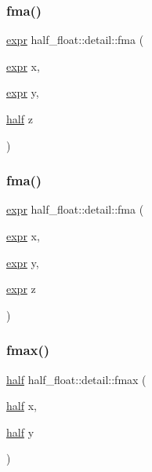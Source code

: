 \subsubsection{\texorpdfstring{fma()}{fma()}\hspace{0.1cm}{\footnotesize\ttfamily [7/8]}}
{\footnotesize\ttfamily \hyperlink{structhalf__float_1_1detail_1_1expr}{expr} half\+\_\+float\+::detail\+::fma (\begin{DoxyParamCaption}\item[{\hyperlink{structhalf__float_1_1detail_1_1expr}{expr}}]{x,  }\item[{\hyperlink{structhalf__float_1_1detail_1_1expr}{expr}}]{y,  }\item[{\hyperlink{classhalf__float_1_1half}{half}}]{z }\end{DoxyParamCaption})\hspace{0.3cm}{\ttfamily [inline]}}

\mbox{\label{namespacehalf__float_1_1detail_a888c0b1d35bed6ccb5484cfe021099ac}} 
\subsubsection{\texorpdfstring{fma()}{fma()}\hspace{0.1cm}{\footnotesize\ttfamily [8/8]}}
{\footnotesize\ttfamily \hyperlink{structhalf__float_1_1detail_1_1expr}{expr} half\+\_\+float\+::detail\+::fma (\begin{DoxyParamCaption}\item[{\hyperlink{structhalf__float_1_1detail_1_1expr}{expr}}]{x,  }\item[{\hyperlink{structhalf__float_1_1detail_1_1expr}{expr}}]{y,  }\item[{\hyperlink{structhalf__float_1_1detail_1_1expr}{expr}}]{z }\end{DoxyParamCaption})\hspace{0.3cm}{\ttfamily [inline]}}

\mbox{\label{namespacehalf__float_1_1detail_a465b9d2dc41f1c10dd7ab9ce3dc2866f}} 
\subsubsection{\texorpdfstring{fmax()}{fmax()}\hspace{0.1cm}{\footnotesize\ttfamily [1/4]}}
{\footnotesize\ttfamily \hyperlink{classhalf__float_1_1half}{half} half\+\_\+float\+::detail\+::fmax (\begin{DoxyParamCaption}\item[{\hyperlink{classhalf__float_1_1half}{half}}]{x,  }\item[{\hyperlink{classhalf__float_1_1half}{half}}]{y }\end{DoxyParamCaption})\hspace{0.3cm}{\ttfamily [inline]}}

